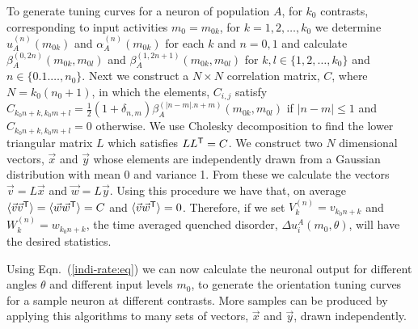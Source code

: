 To generate tuning curves for a neuron of population $A$, for 
$k_0$ contrasts, corresponding to input activities $m_0=m_{0k}$, for 
$k=1,2,\ldots,k_0$ we determine $u_A^{(n)}(m_{0k})$ and 
$\alpha_{A}^{(n)}(m_{0k})$ for each $k$ and $n=0,1$ and calculate
$\beta_A^{(0,2n)}(m_{0k},m_{0l})$ and 
$\beta_A^{(1,2n+1)}(m_{0k},m_{0l})$ for $k,l \in \{1,2,\ldots,k_0\}$
and $n\in \{0.1.\ldots,n_0\}$\@. Next we construct a $N\times N$ correlation 
matrix, $C$, where $N=k_0(n_0+1)$, in which the elements, $C_{i,j}$ satisfy
$C_{k_0n+k,k_0m+l}=\frac{1}{2}(1+\delta_{n,m})\beta_A^{(|n-m|.n+m)}
(m_{0k},m_{0l})$ if $|n-m|\leq 1$ and $C_{k_0n+k,k_0m+l}=0$ otherwise. 
We use Cholesky decomposition \cite{Horn1985} to find the lower triangular matrix 
$L$ which satisfies $LL^{\sf T}=C$\@. We construct two $N$ dimensional vectors, 
$\vec{x}$ and $\vec{y}$ whose elements are independently drawn from a Gaussian 
distribution with mean 0 and variance 1.
From these we calculate the vectors $\vec{v}=L\vec{x}$ and $\vec{w}=L\vec{y}$\@.
Using this procedure we have that, on average $\langle\vec{v}\vec{v}^{\sf T}
\rangle=\langle\vec{w}\vec{w}^{\sf T}\rangle=C$ and $\langle\vec{v}
\vec{w}^{\sf T}\rangle=0$\@.
Therefore, if we set $V_k^{(n)}=v_{k_0n+k}$ and $W_k^{(n)}=w_{k_0n+k}$, the 
time averaged quenched disorder, $\Delta u_i^A(m_0,\theta)$, will have the desired 
statistics. 

Using Eqn.~(\ref{indi-rate:eq}) we can now calculate the neuronal output for
different angles $\theta$ and different input levels $m_0$, to generate the
orientation tuning curves for a sample neuron at different contrasts.
More samples can be produced by applying this algorithms to many sets
of vectors, $\vec{x}$ and $\vec{y}$, drawn independently.
